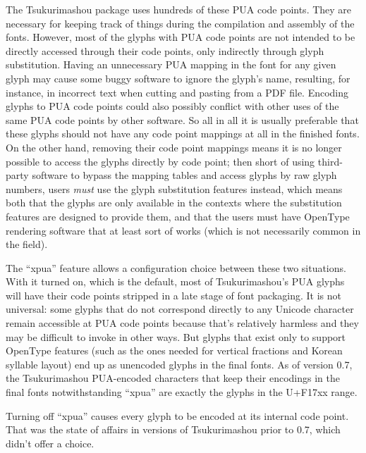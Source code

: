 \documentclass[14pt]{extarticle}
\begin{document}
The Tsukurimashou package uses hundreds of these PUA code points.  They are
necessary for keeping track of things during the compilation and assembly of
the fonts.  However, most of the glyphs with PUA code points are not
intended to be directly accessed through their code points, only indirectly
through glyph substitution.  Having an unnecessary PUA mapping in the font
for any given glyph may cause some buggy software to ignore the glyph's
name, resulting, for instance, in incorrect text when cutting and pasting
from a PDF file.  Encoding glyphs to PUA code points could also possibly
conflict with other uses of the same PUA code points by other software.  So
all in all it is usually preferable that these glyphs should not have any
code point mappings at all in the finished fonts.  On the other hand,
removing their code point mappings means it is no longer possible to access
the glyphs directly by code point; then short of using third-party software
to bypass the mapping tables and access glyphs by raw glyph numbers, users
\emph{must} use the glyph substitution features instead, which means both
that the glyphs are only available in the contexts where the substitution
features are designed to provide them, and that the users must have OpenType
rendering software that at least sort of works (which is not necessarily
common in the field).

The ``xpua'' feature allows a configuration choice between these two
situations.  With it turned on, which is the default, most of
Tsukurimashou's PUA glyphs will have their code points stripped in a late
stage of font packaging.  It is not universal: some glyphs that do not
correspond directly to any Unicode character remain accessible at PUA code
points because that's relatively harmless and they may be difficult to
invoke in other ways.  But glyphs that exist only to support OpenType
features (such as the ones needed for vertical fractions and Korean syllable
layout) end up as unencoded glyphs in the final fonts.  As of version 0.7,
the Tsukurimashou PUA-encoded characters that keep their encodings in the
final fonts notwithstanding ``xpua'' are exactly the glyphs in the U+F17xx
range.

Turning off ``xpua'' causes every glyph to be encoded at its internal code
point.  That was the state of affairs in versions of Tsukurimashou prior to
0.7, which didn't offer a choice.

\end{document}
